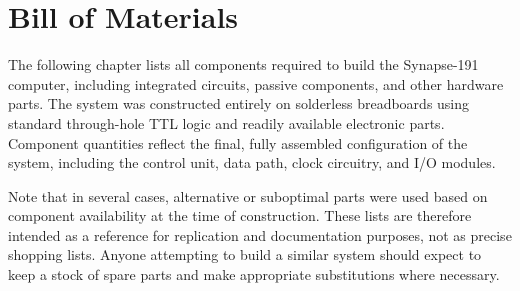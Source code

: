 \chapter{Bill of Materials} \label{sec:bom}
The following chapter lists all components required to build the Synapse-191 computer, including
integrated circuits, passive components, and other hardware parts.  
The system was constructed entirely on solderless breadboards using standard through-hole
TTL logic and readily available electronic parts.  
Component quantities reflect the final, fully assembled configuration of the system,
including the control unit, data path, clock circuitry, and I/O modules.

Note that in several cases, alternative or suboptimal parts were used based on component
availability at the time of construction.  
These lists are therefore intended as a reference for replication and documentation purposes,
not as precise shopping lists.  
Anyone attempting to build a similar system should expect to keep a stock of spare parts and
make appropriate substitutions where necessary.

